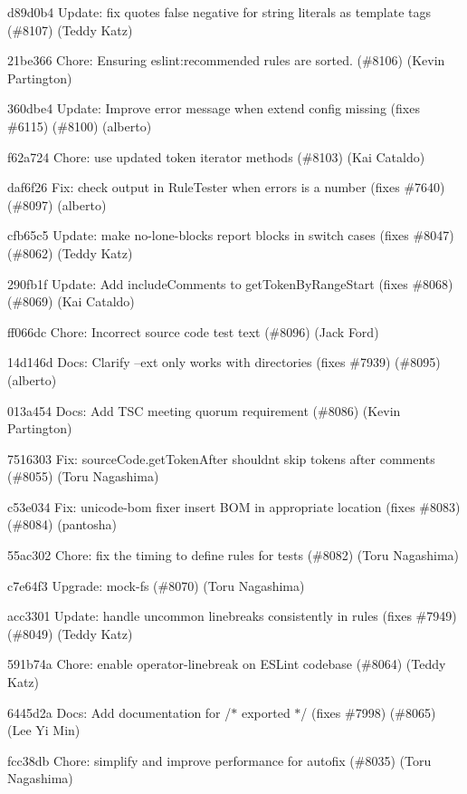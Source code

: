 \begin{DoxyItemize}
\item d89d0b4 Update\+: fix quotes false negative for string literals as template tags (\#8107) (Teddy Katz)
\item 21be366 Chore\+: Ensuring eslint\+:recommended rules are sorted. (\#8106) (Kevin Partington)
\item 360dbe4 Update\+: Improve error message when extend config missing (fixes \#6115) (\#8100) (alberto)
\item f62a724 Chore\+: use updated token iterator methods (\#8103) (Kai Cataldo)
\item daf6f26 Fix\+: check output in Rule\+Tester when errors is a number (fixes \#7640) (\#8097) (alberto)
\item cfb65c5 Update\+: make no-\/lone-\/blocks report blocks in switch cases (fixes \#8047) (\#8062) (Teddy Katz)
\item 290fb1f Update\+: Add include\+Comments to get\+Token\+By\+Range\+Start (fixes \#8068) (\#8069) (Kai Cataldo)
\item ff066dc Chore\+: Incorrect source code test text (\#8096) (Jack Ford)
\item 14d146d Docs\+: Clarify --ext only works with directories (fixes \#7939) (\#8095) (alberto)
\item 013a454 Docs\+: Add TSC meeting quorum requirement (\#8086) (Kevin Partington)
\item 7516303 Fix\+: {\ttfamily source\+Code.\+get\+Token\+After} shouldn\textquotesingle{}t skip tokens after comments (\#8055) (Toru Nagashima)
\item c53e034 Fix\+: unicode-\/bom fixer insert BOM in appropriate location (fixes \#8083) (\#8084) (pantosha)
\item 55ac302 Chore\+: fix the timing to define rules for tests (\#8082) (Toru Nagashima)
\item c7e64f3 Upgrade\+: mock-\/fs (\#8070) (Toru Nagashima)
\item acc3301 Update\+: handle uncommon linebreaks consistently in rules (fixes \#7949) (\#8049) (Teddy Katz)
\item 591b74a Chore\+: enable operator-\/linebreak on ESLint codebase (\#8064) (Teddy Katz)
\item 6445d2a Docs\+: Add documentation for /\texorpdfstring{$\ast$}{*} exported \texorpdfstring{$\ast$}{*}/ (fixes \#7998) (\#8065) (Lee Yi Min)
\item fcc38db Chore\+: simplify and improve performance for autofix (\#8035) (Toru Nagashima)

\end{DoxyItemize}
